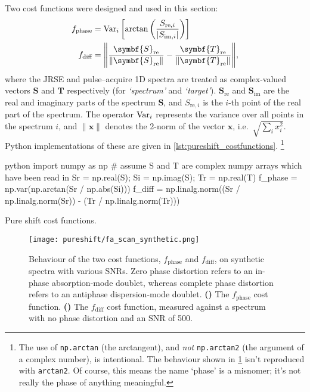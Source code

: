 Two cost functions were designed and used in this section:
\begin{align}
    f_\text{phase} &= \Var_i\left[\arctan\left(\frac{S_{\text{re},i}}{|S_{\text{im},i}|}\right)\right] \label{eq:ps_cf_phase} \\
    f_\text{diff} &= \Biggl\lVert \frac{\symbf{S}_\text{re}}{\lVert \symbf{S}_\text{re} \rVert} - \frac{\symbf{T}_\text{re}}{\lVert \symbf{T}_\text{re} \rVert} \Biggr\rVert, \label{eq:ps_cf_diff}
\end{align}
where the JRSE and pulse--acquire 1D spectra are treated as complex-valued vectors $\symbf{S}$ and $\symbf{T}$ respectively (for \textit{`spectrum'} and \textit{`target'}). $\symbf{S}_\text{re}$ and $\symbf{S}_\text{im}$ are the real and imaginary parts of the spectrum $\symbf{S}$, and $S_{\text{re},i}$ is the $i$-th point of the real part of the spectrum.
The operator $\operatorname{Var}_i$ represents the variance over all points in the spectrum $i$, and $\lVert \symbf{x} \rVert$ denotes the 2-norm of the vector $\symbf{x}$, i.e.\ $\sqrt{\sum_i x_i^2}$.
Python implementations of these are given in \cref{lst:pureshift_costfunctions}.%
\footnote{The use of \texttt{np.arctan} (the arctangent), and \textit{not} \texttt{np.arctan2} (the argument of a complex number), is intentional. The behaviour shown in \cref{fig:fa_scan_synthetic} isn't reproduced with \texttt{arctan2}. Of course, this means the name `phase' is a misnomer; it's not really the phase of anything meaningful.}

\begin{mylisting}[htb]
\begin{tcbminted}{python}
import numpy as np
# assume S and T are complex numpy arrays which have been read in
Sr = np.real(S); Si = np.imag(S); Tr = np.real(T)
f_phase = np.var(np.arctan(Sr / np.abs(Si)))
f_diff = np.linalg.norm((Sr / np.linalg.norm(Sr))
                        - (Tr / np.linalg.norm(Tr)))
\end{tcbminted}
    \caption[Pure shift cost functions]{Pure shift cost functions.}
    \label{lst:pureshift_costfunctions}
\end{mylisting}

\begin{figure}[htb]
    \centering
    \texttt{[image: pureshift/fa\_scan\_synthetic.png]}%
    {\label{fig:fa_scan_synthetic_fphase}}%
    {\label{fig:fa_scan_synthetic_fdiff}}%
    \caption[Evaluation of $f_\text{phase}$ and $f_\text{diff}$ cost functions on synthetic data]{
        Behaviour of the two cost functions, $f_\text{phase}$ and $f_\text{diff}$, on synthetic spectra with various SNRs.
        Zero phase distortion refers to an in-phase absorption-mode doublet, whereas complete phase distortion refers to an antiphase dispersion-mode doublet.
        \textbf{()} The $f_\text{phase}$ cost function.
        \textbf{()} The $f_\text{diff}$ cost function, measured against a spectrum with no phase distortion and an SNR of 500.
    }
    \label{fig:fa_scan_synthetic}
\end{figure}

